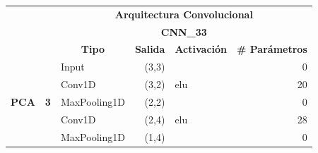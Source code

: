 \begin{table}[H]
\centering
\begin{center}
\begin{tabular}{ll|l|r|l|r|}
\cline{3-6}
                                                    &                             & \multicolumn{4}{c|}{\textbf{Arquitectura Convolucional}}                                                                                                           \\ \cline{3-6} 
                                                    &                             & \multicolumn{4}{c|}{\textbf{CNN\_33}}                                                                                                                                  \\ \cline{3-6} 
                                                    &                             & \multicolumn{1}{c|}{\textbf{Tipo}} & \multicolumn{1}{c|}{\textbf{Salida}} & \multicolumn{1}{c|}{\textbf{Activaci\'{o}n}} & \multicolumn{1}{l|}{\textbf{\# Par\'{a}metros}} \\ \hline
\multicolumn{1}{|l|}{\multirow{8}{*}{\textbf{PCA}}} & \multirow{8}{*}{\textbf{3}} & Input                              & (3,3)                                &                                          & 0                                           \\ \cline{3-6} 
\multicolumn{1}{|l|}{}                              &                             & Conv1D                             & (3,2)                                & elu                                     & 20                                          \\ \cline{3-6} 
\multicolumn{1}{|l|}{}                              &                             & MaxPooling1D                       & (2,2)                                &                                          & 0                                           \\ \cline{3-6} 
\multicolumn{1}{|l|}{}                              &                             & Conv1D                             & (2,4)                                & elu                                     & 28                                          \\ \cline{3-6} 
\multicolumn{1}{|l|}{}                              &                             & MaxPooling1D                       & (1,4)                                &                                          & 0                                           \\ \cline{3-6} 

\end{tabular}
\end{center}
\end{table}
